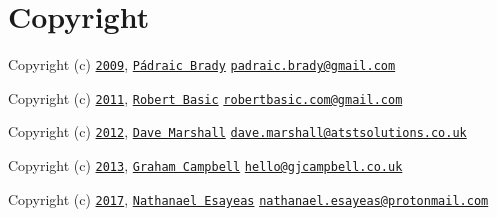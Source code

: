 \chapter{Copyright }
\hypertarget{md__c_1_2xampp_2htdocs_2_g_pagos_ayuntamiento_2vendor_2mockery_2mockery_2_c_o_p_y_r_i_g_h_t}{}\label{md__c_1_2xampp_2htdocs_2_g_pagos_ayuntamiento_2vendor_2mockery_2mockery_2_c_o_p_y_r_i_g_h_t}
\label{md__c_1_2xampp_2htdocs_2_g_pagos_ayuntamiento_2vendor_2mockery_2mockery_2_c_o_p_y_r_i_g_h_t_autotoc_md9883}%
%



\begin{DoxyItemize}
\item Copyright (c) \href{https://github.com/mockery/mockery/commit/1d96f88142abe804ab9e893a5f07933f63e9bff9}{\texttt{2009}}, \href{https://github.com/padraic}{\texttt{Pádraic Brady}} \href{mailto:padraic.brady@gmail.com}{\texttt{padraic.\+brady@gmail.\+com}}
\item Copyright (c) \href{https://github.com/mockery/mockery/commit/94dbb63aab37c659f63ea6e34acc6958928b0f59}{\texttt{2011}}, \href{https://github.com/robertbasic}{\texttt{Robert Basic}} \href{mailto:robertbasic.com@gmail.com}{\texttt{robertbasic.\+com@gmail.\+com}}
\item Copyright (c) \href{https://github.com/mockery/mockery/commit/64e3ad6960eb3202b5b91b91a4ef1cf6252f0fef}{\texttt{2012}}, \href{https://github.com/davedevelopment}{\texttt{Dave Marshall}} \href{mailto:dave.marshall@atstsolutions.co.uk}{\texttt{dave.\+marshall@atstsolutions.\+co.\+uk}}
\item Copyright (c) \href{https://github.com/mockery/mockery/commit/270ddd0bd051251e36a5688c52fc2638a097b110}{\texttt{2013}}, \href{https://github.com/GrahamCampbell}{\texttt{Graham Campbell}} \href{mailto:hello@gjcampbell.co.uk}{\texttt{hello@gjcampbell.\+co.\+uk}}
\item Copyright (c) \href{https://github.com/mockery/mockery/commit/ba28b84c416b95924886bbd64a6a2f68e863536a}{\texttt{2017}}, \href{https://github.com/ghostwriter}{\texttt{Nathanael Esayeas}} \href{mailto:nathanael.esayeas@protonmail.com}{\texttt{nathanael.\+esayeas@protonmail.\+com}} 
\end{DoxyItemize}